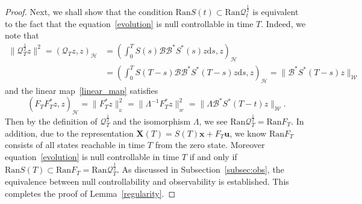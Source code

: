 \documentclass[10pt]{elsarticle}
\begin{document}
\begin{proof}
Next, we shall show that the condition $\textrm{Ran} S(t)\subset \textrm{Ran}\mathcal{Q}_{t}^{\frac{1}{2}}$ is equivalent to the fact that the equation~\eqref{evolution} is null controllable in time $T$. 
Indeed, we note that
\begin{equation*}
\begin{split}
\|\mathcal{Q}_{T}^{\frac{1}{2}}z\|^2 = (\mathcal{Q}_{T}z, z)_{\mathcal{H}} &= (\int_{0}^{T}S(s)\mathcal{B}\mathcal{B}^{\ast}S^{\ast}(s)z \mathrm{d}s, z)_{\mathcal{H}} \\
&= (\int_{0}^{T}S(T-s)\mathcal{B}\mathcal{B}^{\ast}S^{\ast}(T-s)z \mathrm{d}s, z)_{\mathcal{H}}=\|\mathcal{B}^{\ast}S^{\ast}(T-s)z\|_{\mathcal{W}}
\end{split}
\end{equation*}
and the linear map~\eqref{linear_map} satisfies
\[
 (F_{T}F^{\ast}_{T}z, z)_{\mathcal{H}}=\| F^{\ast}_{T}z\|^2_{_{\mathcal{U}}}=\| \Lambda^{-1}F^{\ast}_{T}z\|^2_{_{\mathcal{W}}} = \|\Lambda\mathcal{B}^{\ast}S^{\ast}(T-t)z\|_{\mathcal{W}}.
\]
Then by the definition of $\mathcal{Q}_{T}^{\frac{1}{2}}$ and the isomorphism $\Lambda$, we see $\textrm{Ran}\mathcal{Q}_{T}^{\frac{1}{2}} =\textrm{Ran}F_T$.
In addition, due to the representation $\mathbf{X}(T) =S(T)\mathbf{x} +F_T\mathbf{u}$, we know $\textrm{Ran}F_T$ consists of all states reachable in time $T$ from the zero state.
Moreover equation~\eqref{evolution} is null controllable in time $T$ if and only if $\textrm{Ran}S(T) \subset  \textrm{Ran}F_T = \textrm{Ran}\mathcal{Q}_{T}^{\frac{1}{2}} $. As discussed in Subsection~\ref{subsec:obs}, the equivalence between null controllability and observability is established. This completes the proof of Lemma~\ref{regularity}.
\end{proof}
\end{document}
